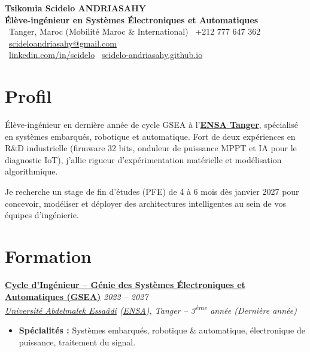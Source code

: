\documentclass[10pt, a4paper]{article}
\newcommand{\cventry}[4]{%
    \noindent\textbf{#1} \hfill \textit{#2} \\
    \textit{#3} \hfill {\footnotesize #4} \vspace{0.2ex}
}
\begin{document}
\pagestyle{empty} %

\begin{center}
	{\huge \textbf{Tsikomia Scidelo ANDRIASAHY}}\\[0.5ex]
	{\large \textcolor{primary}{\textbf{Élève-ingénieur en Systèmes Électroniques et Automatiques}}}\\[0.5ex]
	\small
	\faMapMarker \ Tanger, Maroc (Mobilité Maroc \& International) \quad
	\faPhone \ +212 777 647 362 \quad
	\faEnvelope \ \href{mailto:scideloandriasahy@gmail.com}{scideloandriasahy@gmail.com} \\[0.5ex]
	\faLinkedin \ \href{https://linkedin.com/in/scidelo}{linkedin.com/in/scidelo} \quad
	\faGithub \ \href{https://scidelo-andriasahy.github.io/}{scidelo-andriasahy.github.io}
\end{center}

\vspace{-1ex}



\section*{Profil}
\noindent Élève-ingénieur en dernière année de cycle GSEA à l'\href{https://ensat.ac.ma/Portail/}{\textbf{ENSA Tanger}}, spécialisé en systèmes embarqués, robotique et automatique. Fort de deux expériences en R\&D industrielle (firmware 32 bits, onduleur de puissance MPPT et IA pour le diagnostic IoT), j'allie rigueur d'expérimentation matérielle et modélisation algorithmique.

\noindent Je recherche un stage de fin d'études (PFE) de 4 à 6 mois dès janvier 2027 pour concevoir, modéliser et déployer des architectures intelligentes au sein de vos équipes d'ingénierie.



\section*{Formation}

\cventry{\href{https://ensat.ac.ma/Portail/genie-des-systemes-electroniques-et-automatiques-gsea/}{Cycle d'Ingénieur – Génie des Systèmes Électroniques et Automatiques (GSEA)}}{2022 -- 2027}
{\href{https://www.uae.ac.ma/}{Université Abdelmalek Essaâdi} (\href{https://ensat.ac.ma/Portail/}{ENSA}), Tanger -- \textit{3\textsuperscript{ème} année (Dernière année)}}{}
\begin{itemize}
	\item \textbf{Spécialités :} Systèmes embarqués, robotique \& automatique, électronique de puissance, traitement du signal.
\end{itemize}
\vspace{0.6ex}
\end{document}
